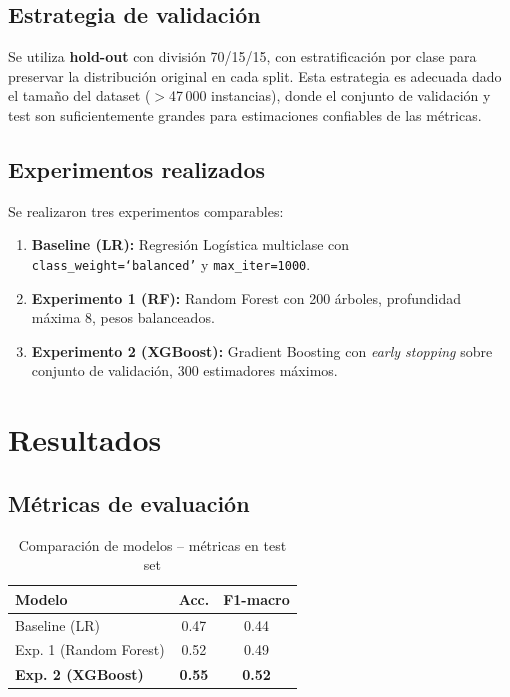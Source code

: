 \documentclass[10pt,twocolumn]{article}
\begin{document}
\subsection{Estrategia de validación}

Se utiliza \textbf{hold-out} con división 70/15/15, con estratificación
por clase para preservar la distribución original en cada split.
Esta estrategia es adecuada dado el tamaño del dataset ($>$47\,000
instancias), donde el conjunto de validación y test son suficientemente
grandes para estimaciones confiables de las métricas.

\subsection{Experimentos realizados}

Se realizaron tres experimentos comparables:

\begin{enumerate}[leftmargin=*,topsep=2pt,itemsep=2pt]
  \item \textbf{Baseline (LR):} Regresión Logística multiclase
        con \texttt{class\_weight=`balanced'} y \texttt{max\_iter=1000}.
  \item \textbf{Experimento 1 (RF):} Random Forest con 200 árboles,
        profundidad máxima 8, pesos balanceados.
  \item \textbf{Experimento 2 (XGBoost):} Gradient Boosting con
        \textit{early stopping} sobre conjunto de validación,
        300 estimadores máximos.
\end{enumerate}

\section{Resultados}

\subsection{Métricas de evaluación}

\begin{table}[H]
\centering
\caption{Comparación de modelos -- métricas en test set}
\label{tab:resultados}
\begin{tabular}{lcc}
\toprule
\textbf{Modelo} & \textbf{Acc.} & \textbf{F1-macro} \\
\midrule
Baseline (LR)           & 0.47 & 0.44 \\
Exp. 1 (Random Forest)  & 0.52 & 0.49 \\
\textbf{Exp. 2 (XGBoost)} & \textbf{0.55} & \textbf{0.52} \\
\bottomrule
\end{tabular}
\end{table}
\end{document}
